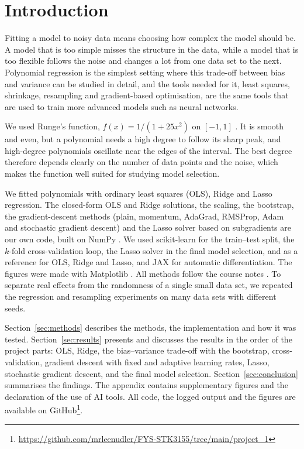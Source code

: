 
\section{Introduction}\label{sec:intro}

Fitting a model to noisy data means choosing how complex the model should be. A model that is too simple misses the structure in the data, while a model that is too flexible follows the noise and changes a lot from one data set to the next. Polynomial regression is the simplest setting where this trade-off between bias and variance can be studied in detail, and the tools needed for it, least squares, shrinkage, resampling and gradient-based optimisation, are the same tools that are used to train more advanced models such as neural networks.

We used Runge's function, $f(x) = 1/(1 + 25x^2)$ on $[-1, 1]$ \cite{Runge1901}. It is smooth and even, but a polynomial needs a high degree to follow its sharp peak, and high-degree polynomials oscillate near the edges of the interval. The best degree therefore depends clearly on the number of data points and the noise, which makes the function well suited for studying model selection.

We fitted polynomials with ordinary least squares (OLS), Ridge and Lasso regression. The closed-form OLS and Ridge solutions, the scaling, the bootstrap, the gradient-descent methods (plain, momentum, AdaGrad, RMSProp, Adam and stochastic gradient descent) and the Lasso solver based on subgradients are our own code, built on NumPy \cite{Harris2020}. We used scikit-learn \cite{Pedregosa2011} for the train--test split, the $k$-fold cross-validation loop, the Lasso solver in the final model selection, and as a reference for OLS, Ridge and Lasso, and JAX \cite{Jax2018} for automatic differentiation. The figures were made with Matplotlib \cite{Hunter2007}. All methods follow the course notes \cite{HjorthJensen2026}. To separate real effects from the randomness of a single small data set, we repeated the regression and resampling experiments on many data sets with different seeds.

Section~\ref{sec:methods} describes the methods, the implementation and how it was tested. Section~\ref{sec:results} presents and discusses the results in the order of the project parts: OLS, Ridge, the bias--variance trade-off with the bootstrap, cross-validation, gradient descent with fixed and adaptive learning rates, Lasso, stochastic gradient descent, and the final model selection. Section~\ref{sec:conclusion} summarises the findings. The appendix contains supplementary figures and the declaration of the use of AI tools. All code, the logged output and the figures are available on GitHub\footnote{\url{https://github.com/mrleenudler/FYS-STK3155/tree/main/project_1}}.
